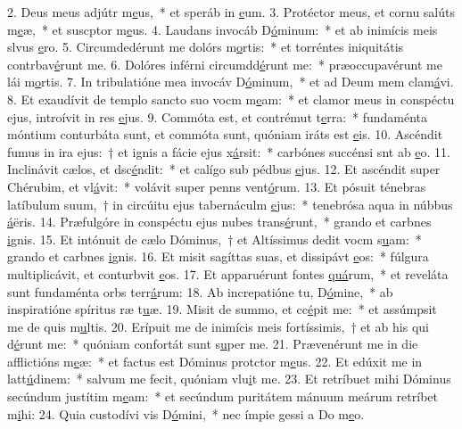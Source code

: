 2. Deus meus adjútr m\uline{e}us,~* et speráb in \uline{e}um.
3. Protéctor meus, et cornu salúts m\uline{e}æ,~* et suscptor m\uline{e}us.
4. Laudans invocáb D\uline{ó}minum:~* et ab inimícis meis slvus \uline{e}ro.
5. Circumdedérunt me dolórs m\uline{o}rtis:~* et torréntes iniquitátis contrbav\uline{é}runt me.
6. Dolóres inférni circumdd\uline{é}runt me:~* præoccupavérunt me lái m\uline{o}rtis.
7. In tribulatióne mea invocáv D\uline{ó}minum,~* et ad Deum mem clam\uline{á}vi.
8. Et exaudívit de templo sancto suo vocm m\uline{e}am:~* et clamor meus in conspéctu ejus, introívit in res \uline{e}jus.
9. Commóta est, et contrémut t\uline{e}rra:~* fundaménta móntium conturbáta sunt, et commóta sunt, quóniam iráts est \uline{e}is.
10. Ascéndit fumus in ira ejus:~† et ignis a fácie ejus x\uline{á}rsit:~* carbónes succénsi snt ab \uline{e}o.
11. Inclinávit cælos, et dsc\uline{é}ndit:~* et calígo sub pédbus \uline{e}jus.
12. Et ascéndit super Chérubim, et vl\uline{á}vit:~* volávit super penns vent\uline{ó}rum.
13. Et pósuit ténebras latíbulum suum,~† in circúitu ejus tabernáculm \uline{e}jus:~* tenebrósa aqua in núbbus \uline{á}ëris.
14. Præfulgóre in conspéctu ejus nubes trans\uline{é}runt,~* grando et carbnes \uline{i}gnis.
15. Et intónuit de cælo Dóminus,~† et Altíssimus dedit vocm s\uline{u}am:~* grando et carbnes \uline{i}gnis.
16. Et misit sagíttas suas, et dissipávt \uline{e}os:~* fúlgura multiplicávit, et conturbvit \uline{e}os.
17. Et apparuérunt fontes \uline{quá}rum,~* et reveláta sunt fundaménta orbs terr\uline{á}rum:
18. Ab increpatióne tu, D\uline{ó}mine,~* ab inspiratióne spíritus ræ t\uline{u}æ.
19. Misit de summo, et cc\uline{é}pit me:~* et assúmpsit me de quis m\uline{u}ltis.
20. Erípuit me de inimícis meis fortíssimis,~† et ab his qui d\uline{é}runt me:~* quóniam confortát sunt s\uline{u}per me.
21. Prævenérunt me in die afflictións m\uline{e}æ:~* et factus est Dóminus protctor m\uline{e}us.
22. Et edúxit me in latt\uline{ú}dinem:~* salvum me fecit, quóniam vlu\uline{i}t me.
23. Et retríbuet mihi Dóminus secúndum justítim m\uline{e}am:~* et secúndum puritátem mánuum meárum retríbet m\uline{i}hi:
24. Quia custodívi vis D\uline{ó}mini,~* nec ímpie gessi a Do m\uline{e}o.
